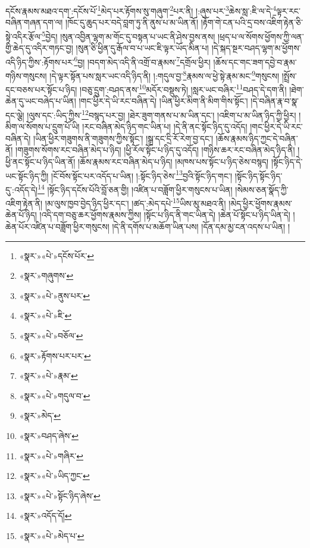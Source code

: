 དངོས་རྣམས་མཐའ་དག་:དངོས་པོ་\footnote{«སྣར་»«པེ་»དངོས་པོར་}མེད་པར་རྟོགས་སུ་གཞུག་\footnote{«སྣར་»གཞུགས་}པར་ནི། །:ཞུས་པར་\footnote{«སྣར་»«པེ་»ནུས་པར་}ཆེས་སླ་:ཇི་ལ་དེ་\footnote{«སྣར་»«པེ་»ཇི་}ལྟར་རང་བཞིན་གཞན་དག་ལ། །ཁོང་དུ་ཆུད་པར་བདེ་བླག་ཏུ་ནི་ནུས་པ་མ་ཡིན་ནོ། །རྟོག་གེ་ངན་པའི་དྲ་བས་འཇིག་རྟེན་ཅི་སྟེ་འདིར་རྩོལ་\footnote{«སྣར་»«པེ་»བཅོལ་}བྱེད། །སུན་འབྱིན་ལྷག་མ་གོང་དུ་བསྟན་པ་ཡང་ནི་ཤེས་བྱས་ནས། །ཕྲད་པ་ལ་སོགས་ཕྱོགས་ཀྱི་ལན་གྱི་ཆེད་དུ་འདིར་གཏང་བྱ། །སུན་ཅི་ཕྱིན་དུ་རྒོལ་བ་པ་ཡང་ཇི་ལྟར་ཡོད་མིན་པ། །དེ་སྐད་སྔར་བཤད་ལྷག་མ་ཕྱོགས་འདི་ཉིད་ཀྱིས་:རྟོགས་པར་\footnote{«སྣར་»རྟོགས་པར་པར་}བྱ། །བདག་མེད་འདི་ནི་འགྲོ་བ་རྣམས་\footnote{«སྣར་»«པེ་»རྣམ་}དགྲོལ་ཕྱིར། །ཆོས་དང་གང་ཟག་དབྱེ་བ་རྣམ་གཉིས་གསུངས། །དེ་ལྟར་སྟོན་པས་སླར་ཡང་འདི་ཉིད་ནི། །:གདུལ་བྱ་\footnote{«སྣར་»«པེ་»གདུལ་བ་}རྣམས་ལ་ཕྱེ་སྟེ་རྣམ་མང་\footnote{«སྣར་»མེད་}གསུངས། །སྤྲོས་དང་བཅས་པར་སྟོང་པ་ཉིད། །བཅུ་དྲུག་:བཤད་ནས་\footnote{«སྣར་»བཤད་ཞེས་}མདོར་བསྡུས་ཏེ། །སླར་ཡང་བཞིར་\footnote{«སྣར་»«པེ་»གཞིར་}བཤད་དེ་དག་ནི། །ཐེག་ཆེན་དུ་ཡང་བཞེད་པ་ཡིན། །གང་ཕྱིར་དེ་ཡི་རང་བཞིན་དེ། །ཡིན་ཕྱིར་མིག་ནི་མིག་གིས་སྟོང་། །དེ་བཞིན་རྣ་བ་སྣ་དང་ལྕེ། །ལུས་དང་:ཡིད་ཀྱིས་\footnote{«སྣར་»«པེ་»ཡིད་ཀྱང་}བསྙད་པར་བྱ། །ཐེར་ཟུག་གནས་པ་མ་ཡིན་དང་། །འཇིག་པ་མ་ཡིན་ཉིད་ཀྱི་ཕྱིར། །མིག་ལ་སོགས་པ་དྲུག་པོ་ཡི། །རང་བཞིན་མེད་ཉིད་གང་ཡིན་པ། །དེ་ནི་ནང་སྟོང་ཉིད་དུ་འདོད། །གང་ཕྱིར་དེ་ཡི་རང་བཞིན་དེ། །ཡིན་ཕྱིར་གཟུགས་ནི་གཟུགས་ཀྱིས་སྟོང་། །སྒྲ་དང་དྲི་རོ་རེག་བྱ་དང་། །ཆོས་རྣམས་ཉིད་ཀྱང་དེ་བཞིན་ནོ། །གཟུགས་སོགས་རང་བཞིན་མེད་པ་ཉིད། །ཕྱི་རོལ་སྟོང་པ་ཉིད་དུ་འདོད། །གཉིས་ཆར་རང་བཞིན་མེད་ཉིད་ནི། །ཕྱི་ནང་སྟོང་པ་ཉིད་ཡིན་ནོ། །ཆོས་རྣམས་རང་བཞིན་མེད་པ་ཉིད། །མཁས་པས་སྟོང་པ་ཉིད་ཅེས་བསྙད། །སྟོང་ཉིད་དེ་ཡང་སྟོང་ཉིད་ཀྱི། །ངོ་བོས་སྟོང་པར་འདོད་པ་ཡིན། །:སྟོང་ཉིད་ཅེས་\footnote{«སྣར་»«པེ་»སྟོང་ཉིད་ཞེས་}བྱའི་སྟོང་ཉིད་གང་། །སྟོང་ཉིད་སྟོང་ཉིད་དུ་:འདོད་དེ།\footnote{«སྣར་»འདོད་དོ།} །སྟོང་ཉིད་དངོས་པོའི་བློ་ཅན་གྱི། །འཛིན་པ་བཟློག་ཕྱིར་གསུངས་པ་ཡིན། །སེམས་ཅན་སྣོད་ཀྱི་འཇིག་རྟེན་ནི། །མ་ལུས་ཁྱབ་བྱེད་ཉིད་ཕྱིར་དང་། །ཚད་:མེད་དཔེ་\footnote{«སྣར་»«པེ་»མེད་པ་}ཡིས་མུ་མཐའ་ནི། །མེད་ཕྱིར་ཕྱོགས་རྣམས་ཆེན་པོ་ཉིད། །འདི་དག་བཅུ་ཆར་ཕྱོགས་རྣམས་ཀྱིས། །སྟོང་པ་ཉིད་ནི་གང་ཡིན་དེ། །ཆེན་པོ་སྟོང་པ་ཉིད་ཡིན་དེ། །ཆེན་པོར་འཛིན་པ་བཟློག་ཕྱིར་གསུངས། །དེ་ནི་དགོས་པ་མཆོག་ཡིན་པས། །དོན་དམ་མྱ་ངན་འདས་པ་ཡིན། །
